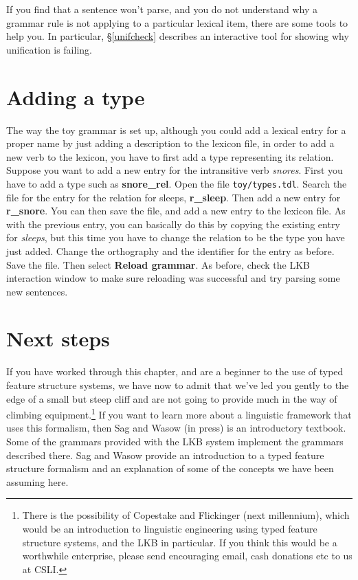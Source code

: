 \documentclass[12pt]{report}
\begin{document}
If you find that a sentence won't parse, and you do not understand
why a grammar rule is not applying to a particular lexical
item, there are some tools to help you.  In particular,
\S\ref{unifcheck} describes an interactive tool for 
showing why unification is failing.

\section{Adding a type}

The way the toy grammar is set up, although you could add a lexical
entry for a proper name by just adding a description to the lexicon file,
in order to add a new verb to the lexicon, you have to first add a type
representing its relation.  Suppose you want to add a new entry for
the intransitive verb {\it snores}.  First you have to add a type such as
{\bf snore\_rel}.  Open the file {\tt toy/types.tdl}.  Search the file for
the entry for the relation for sleeps, {\bf r\_sleep}.  Then add a new
entry for {\bf r\_snore}.  You can then save the file, and add a new entry
to the lexicon file.  As with the previous entry, you can basically do
this by copying the existing entry for {\it sleeps},
but this time you have to change the relation to be the type you have just added.
Change the orthography and the identifier for the entry as before.
Save the file.  Then select {\bf Reload grammar}.  As before, check
the LKB interaction window to make sure reloading was successful and try parsing
some new sentences.


\section{Next steps}

If you have worked through this chapter, and
are a beginner to the use of typed feature
structure systems, we have now to admit that we've led you gently to the edge
of a small but steep cliff and are not going to provide much in the
way of climbing equipment.\footnote{There is the possibility of
Copestake and Flickinger (next millennium), which would be an introduction
to linguistic engineering using typed feature structure systems, and the LKB
in particular.  If you think this would be a worthwhile enterprise, please send
encouraging email, cash donations etc to us at CSLI.}  If you want to learn more
about a linguistic framework that uses this formalism, 
then Sag and Wasow (in press) is an introductory textbook.  Some of the
grammars provided with the LKB system implement the grammars described there.  
Sag and Wasow provide an introduction to a typed feature structure formalism
and an explanation of some of the concepts we have been assuming here.
\end{document}
